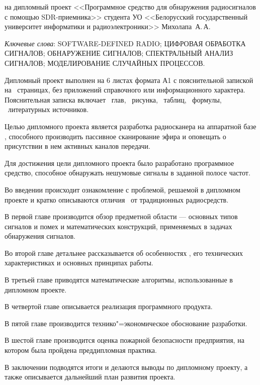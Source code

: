 \thispagestyle{empty}

\begin{center}
  \begin{minipage}{0.82\textwidth}
    на дипломный проект <<Программное средство для обнаружения радиосигналов с помощью SDR-приемника>> студента УО <<Белорусский государственный университет информатики и радиоэлектроники>> Михолапа~А.\,А.
  \end{minipage}
\end{center}

\emph{Ключевые слова}: \MakeUppercase{software-defined radio; цифровая обработка сигналов; обнаружение сигналов; спектральный анализ сигналов; моделирование случайных процессов}.

\vspace{4\parsep}

Дипломный проект выполнен на 6 листах формата А1 с пояснительной запиской на~\pageref*{LastPage} страницах, без приложений справочного или информационного характера. 
Пояснительная записка включает ~глав, \totfig{}~рисунка, \tottab{}~таблиц, \toteq{}~формулы, \totref{}~литературных источников.

Целью дипломного проекта является разработка радиосканера на аппаратной базе \sdr, способного производить пассивное сканирование эфира и оповещать о присутствии в нем активных каналов передачи.

Для достижения цели дипломного проекта было разработано программное средство, способное обнаружать нешумовые сигналы в заданной полосе частот.

Во введении происходит ознакомление с проблемой, решаемой в дипломном проекте и кратко описываются отличия \SDR\ от традиционных радиосредств.

В первой главе производится обзор предметной области --- основных типов сигналов и помех и математических конструкций, применяемых в задачах обнаружения сигналов.

Во второй главе детальнее рассказывается об особенностях \SDR, его технических характеристиках и основных принципах работы.

В третьей главе приводятся математические алгоритмы, использованные в дипломном проекте.

В четвертой главе описывается реализация программного продукта.

В пятой главе производится технико"=экономическое обоснование разработки.

В шестой главе производится оценка пожарной безопасности предприятия, на котором была пройдена преддипломная практика.

В заключении подводятся итоги и делаются выводы по дипломному проекту, а также описывается дальнейший план развития проекта.

\clearpage
